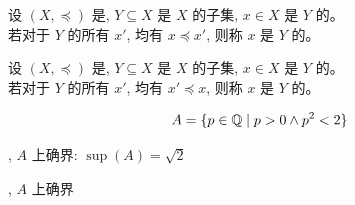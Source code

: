 \begin{frame}{}
  \begin{definition}
    设 $(X, \preceq)$ 是, $Y \subseteq X$ 是 $X$ 的子集,
    $x \in X$ 是 $Y$ 的。 \pause\\[5pt]
    若对于 $Y$ 的所有 $x'$, 均有 $x \preceq x'$,
    则称 $x$ 是 $Y$ 的。
  \end{definition}

  \pause

  \pause
  \begin{definition}
    设 $(X, \preceq)$ 是, $Y \subseteq X$ 是 $X$ 的子集,
    $x \in X$ 是 $Y$ 的。 \\[5pt]
    若对于 $Y$ 的所有 $x'$, 均有 $x' \preceq x$,
    则称 $x$ 是 $Y$ 的。
  \end{definition}
\end{frame}

\begin{frame}{}
  \begin{exampleblock}{}
    \[
      A = \{p \in \mathbb{Q} \mid p > 0 \land p^2 < 2\}
    \]
  \end{exampleblock}

  \pause
  \vspace{1em}
  \begin{center}
    , $A$ 上确界: $\sup(A) = \sqrt{2}$

    \pause
    \vspace{1em}
    , $A$ 上确界
  \end{center}
\end{frame}

